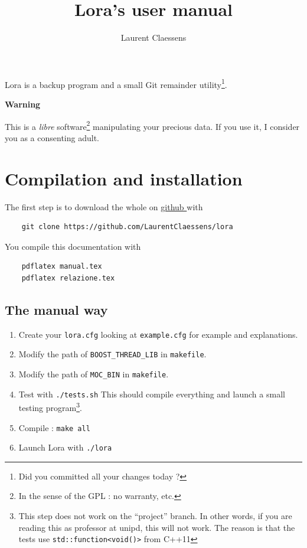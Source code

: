 \documentclass[a4paper,12pt]{article}
\newcommand{\info}[1]{\texttt{#1}}
\begin{document}
\title{Lora's user manual}
\author{Laurent Claessens}
\maketitle

Lora is a backup program and a small Git remainder utility\footnote{Did you committed all your changes today ?}.

\begin{center}
    {\bf Warning}
\end{center}
This is a \emph{libre} software\footnote{In the sense of the GPL : no warranty, etc.} manipulating your precious data. If you use it, I consider you as a consenting adult.

\tableofcontents

\section{Compilation and installation}

The first step is to download the whole on \href{ https://github.com/LaurentClaessens/lora  }{ github } with
\begin{verbatim}
    git clone https://github.com/LaurentClaessens/lora
\end{verbatim}
You compile this documentation with
\begin{verbatim}
    pdflatex manual.tex
    pdflatex relazione.tex
\end{verbatim}

\subsection{The manual way}

\begin{enumerate}
    \item
        Create your \info{lora.cfg} looking at \info{example.cfg} for example and explanations.
    \item
        Modify the path of \info{BOOST\_THREAD\_LIB} in \info{makefile}.
    \item
        Modify the path of \info{MOC\_BIN} in \info{makefile}.
    \item
        Test with \info{./tests.sh} This should compile everything and launch a small testing program\footnote{This step does not work on the ``project'' branch. In other words, if you are reading this as professor at unipd, this will not work. The reason is that the tests use \info{std::function<void()>} from C++11 }.
    \item
        Compile : \info{make all}
    \item
        Launch Lora with \info{./lora}
\end{enumerate}
\end{document}
